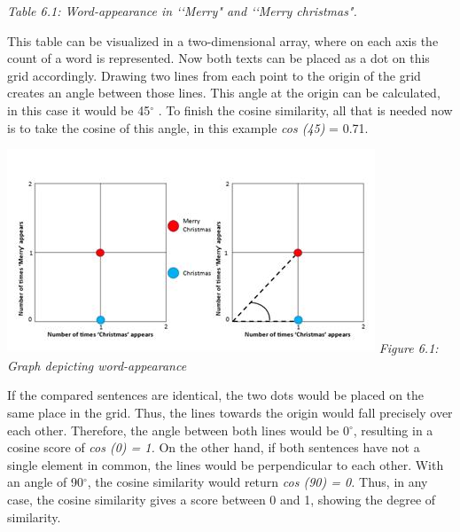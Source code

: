 \begin{center}

{\it \footnotesize Table 6.1: Word-appearance in \lq\lq Merry" and \lq\lq Merry christmas".}
\end{center}
\vspace{0.3cm}

 \noindent This table can be visualized in a two-dimensional array, where on each axis the count of a word is represented. Now both texts can be placed as a dot on this grid accordingly. Drawing two lines from each point to the origin of the grid creates an angle between those lines. This angle at the origin can be calculated, in this case it would be 45$^{\circ}$ . To finish the cosine similarity, all that is needed now is to take the cosine of this angle, in this example \textit{cos (45)} = 0.71. 


\begin{center}
	\includegraphics[scale=0.9]{./Images/graphs.jpg}
	{\it \footnotesize Figure 6.1: Graph depicting word-appearance}
\end{center}

If the compared sentences are identical, the two dots would be placed on the same place in the grid. Thus, the lines towards the origin would fall precisely over each other. Therefore, the angle between both lines would be 0$^{\circ}$, resulting in a cosine score of \textit{cos (0) = 1.} On the other hand, if both sentences have not a single element in common, the lines would be perpendicular to each other. With an angle of 90$^{\circ}$, the cosine similarity would return \textit{cos (90) = 0.} Thus, in any case, the cosine similarity gives a score between 0 and 1, showing the degree of similarity. 

